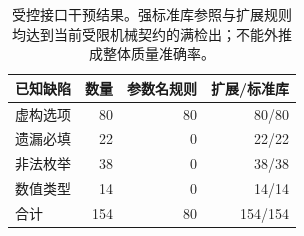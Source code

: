 \begin{table}[t]
\caption{受控接口干预结果。强标准库参照与扩展规则均达到当前受限机械契约的满检出；不能外推成整体质量准确率。}\label{tab:faults}
\centering\small
\begin{tabularx}{\columnwidth}{Xrrr}
\toprule
已知缺陷 & 数量 & 参数名规则 & 扩展/标准库 \\
\midrule
虚构选项 & 80 & 80 & 80/80 \\
遗漏必填 & 22 & 0 & 22/22 \\
非法枚举 & 38 & 0 & 38/38 \\
数值类型 & 14 & 0 & 14/14 \\
合计 & 154 & 80 & 154/154 \\
\bottomrule
\end{tabularx}
\end{table}
